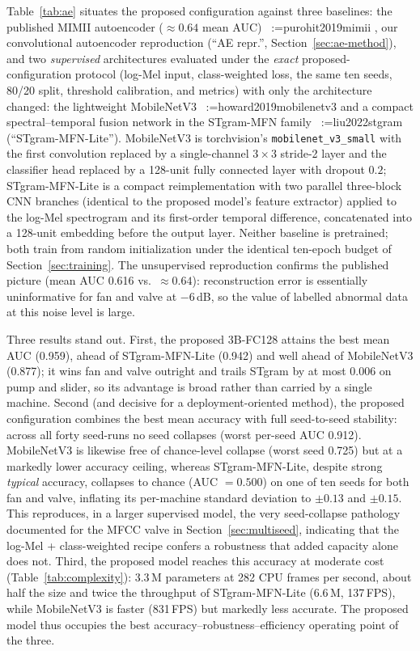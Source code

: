 \documentclass[review,nopreprintline]{elsarticle}
\makeatletter
\newif\ifmc@notfirst
\let\@oldcite\cite
\def\mc@splitcite#1{%
    \begingroup
    \mc@notfirstfalse
    \@for\@citekey:=#1\do{%
      \ifmc@notfirst, \fi
      \mc@notfirsttrue
      \@oldcite{\@citekey}%
    }%
    \endgroup
  }%
\def\cite#1{\protect\mc@splitcite{#1}}%
\makeatother
\begin{document}
Table~\ref{tab:ae} situates the proposed configuration against three baselines: the published MIMII autoencoder ($\approx0.64$ mean AUC)~\cite{purohit2019mimii}, our convolutional autoencoder reproduction (``AE repr.'', Section~\ref{sec:ae-method}), and two \emph{supervised} architectures evaluated under the \emph{exact} proposed-configuration protocol (log-Mel input, class-weighted loss, the same ten seeds, 80/20 split, threshold calibration, and metrics) with only the architecture changed: the lightweight MobileNetV3~\cite{howard2019mobilenetv3} and a compact spectral--temporal fusion network in the STgram-MFN family~\cite{liu2022stgram} (``STgram-MFN-Lite''). MobileNetV3 is torchvision's \texttt{mobilenet\_v3\_small} with the first convolution replaced by a single-channel $3\times3$ stride-2 layer and the classifier head replaced by a 128-unit fully connected layer with dropout $0.2$; STgram-MFN-Lite is a compact reimplementation with two parallel three-block CNN branches (identical to the proposed model's feature extractor) applied to the log-Mel spectrogram and its first-order temporal difference, concatenated into a 128-unit embedding before the output layer. Neither baseline is pretrained; both train from random initialization under the identical ten-epoch budget of Section~\ref{sec:training}. The unsupervised reproduction confirms the published picture (mean AUC 0.616 vs.\ $\approx0.64$): reconstruction error is essentially uninformative for fan and valve at $-6$\,dB, so the value of labelled abnormal data at this noise level is large.

Three results stand out. First, the proposed 3B-FC128 attains the best mean AUC (0.959), ahead of STgram-MFN-Lite (0.942) and well ahead of MobileNetV3 (0.877); it wins fan and valve outright and trails STgram by at most 0.006 on pump and slider, so its advantage is broad rather than carried by a single machine. Second (and decisive for a deployment-oriented method), the proposed configuration combines the best mean accuracy with full seed-to-seed stability: across all forty seed-runs no seed collapses (worst per-seed AUC 0.912). MobileNetV3 is likewise free of chance-level collapse (worst seed 0.725) but at a markedly lower accuracy ceiling, whereas STgram-MFN-Lite, despite strong \emph{typical} accuracy, collapses to chance (AUC $=0.500$) on one of ten seeds for both fan and valve, inflating its per-machine standard deviation to $\pm0.13$ and $\pm0.15$. This reproduces, in a larger supervised model, the very seed-collapse pathology documented for the MFCC valve in Section~\ref{sec:multiseed}, indicating that the log-Mel + class-weighted recipe confers a robustness that added capacity alone does not. Third, the proposed model reaches this accuracy at moderate cost (Table~\ref{tab:complexity}): 3.3\,M parameters at 282 CPU frames per second, about half the size and twice the throughput of STgram-MFN-Lite (6.6\,M, 137\,FPS), while MobileNetV3 is faster (831\,FPS) but markedly less accurate. The proposed model thus occupies the best accuracy--robustness--efficiency operating point of the three.
\end{document}
